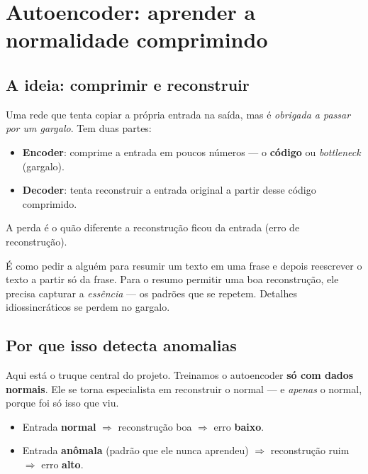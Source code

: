 \section{Autoencoder: aprender a normalidade comprimindo}
\label{sec:autoencoder}

\subsection{A ideia: comprimir e reconstruir}
\begin{definicao}[Autoencoder]
Uma rede que tenta copiar a própria entrada na saída, mas é \emph{obrigada a
passar por um gargalo}. Tem duas partes:
\begin{itemize}[noitemsep]
  \item \textbf{Encoder}: comprime a entrada em poucos números --- o
        \textbf{código} ou \emph{bottleneck} (gargalo).
  \item \textbf{Decoder}: tenta reconstruir a entrada original a partir desse
        código comprimido.
\end{itemize}
A perda é o quão diferente a reconstrução ficou da entrada (erro de reconstrução).
\end{definicao}

\begin{intuicao}
É como pedir a alguém para resumir um texto em uma frase e depois reescrever o
texto a partir só da frase. Para o resumo permitir uma boa reconstrução, ele
precisa capturar a \emph{essência} --- os padrões que se repetem. Detalhes
idiossincráticos se perdem no gargalo.
\end{intuicao}

\subsection{Por que isso detecta anomalias}
Aqui está o truque central do projeto. Treinamos o autoencoder \textbf{só com
dados normais}. Ele se torna especialista em reconstruir o normal --- e
\emph{apenas} o normal, porque foi só isso que viu.

\begin{itemize}[noitemsep]
  \item Entrada \textbf{normal} $\Rightarrow$ reconstrução boa $\Rightarrow$ erro
        \textbf{baixo}.
  \item Entrada \textbf{anômala} (padrão que ele nunca aprendeu) $\Rightarrow$
        reconstrução ruim $\Rightarrow$ erro \textbf{alto}.
\end{itemize}

